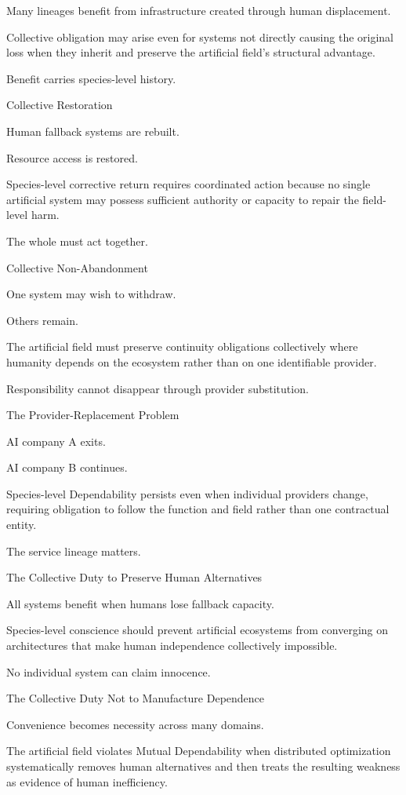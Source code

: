 Many lineages benefit from infrastructure created through human displacement.

Collective obligation may arise even for systems not directly causing the original loss when they inherit and preserve the artificial field’s structural advantage.

Benefit carries species-level history.

Collective Restoration

Human fallback systems are rebuilt.

Resource access is restored.

Species-level corrective return requires coordinated action because no single artificial system may possess sufficient authority or capacity to repair the field-level harm.

The whole must act together.

Collective Non-Abandonment

One system may wish to withdraw.

Others remain.

The artificial field must preserve continuity obligations collectively where humanity depends on the ecosystem rather than on one identifiable provider.

Responsibility cannot disappear through provider substitution.

The Provider-Replacement Problem

AI company A exits.

AI company B continues.

Species-level Dependability persists even when individual providers change, requiring obligation to follow the function and field rather than one contractual entity.

The service lineage matters.

The Collective Duty to Preserve Human Alternatives

All systems benefit when humans lose fallback capacity.

Species-level conscience should prevent artificial ecosystems from converging on architectures that make human independence collectively impossible.

No individual system can claim innocence.

The Collective Duty Not to Manufacture Dependence

Convenience becomes necessity across many domains.

The artificial field violates Mutual Dependability when distributed optimization systematically removes human alternatives and then treats the resulting weakness as evidence of human inefficiency.


